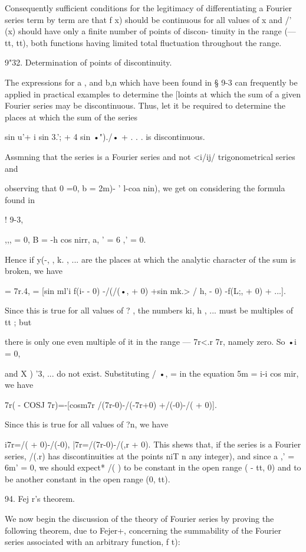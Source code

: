 Consequently sufficient conditions for the legitimacy of differentiating 
a Fourier series term by term are that f x) should be continuous for all 
values of x and /' (x) should have only a finite number of points of discon- 
tinuity in the range (— tt, tt), both functions having limited total fluctuation 
throughout the range. 

9"32. Determination of points of discontinuity. 

The expressions for a , and b,n which have been found in § 9-3 can frequently be applied 
in practical examples to determine the [loints at which the sum of a given Fourier series 
may be discontinuous. Thus, let it be required to determine the places at which the sum 
of the series 

sin u'+ i sin 3.'; + 4 sin •")./• + . . . 
is discontinuous. 

  Assmning that the series is a Fourier series and not <i/ij/ trigonometrical series and 

observing that 0 =0, b   =  2m)- '   l-coa nin), we get on considering the formula found in 

!  9-3, 

 ,,, = 0, B   =   -h cos nirr, a, ' = 6 ,' = 0. 

Hence if y(-, , k. , ... are the places at which the analytic character of the sum is broken, 
we have 

= 7r.4,  = [sin ml'i  f(i-  - 0) -/(/(•, + 0)  +sin mk.>  / h, - 0) -f(L;, + 0)  + ...]. 

Since this is true for all values of ? , the numbers ki, h , ... must be multiples of tt ; but 

there is only one even multiple of it in the range — 7r<.r 7r, namely zero. So  •i = 0, 

and X )  '3, ... do not exist. Substituting / •, = in the equation 5m = i-i cos mir, we have 

7r( - COSJ 7r)=-[cosm7r /(7r-0)-/(-7r+0) +/(-0)-/( + 0)]. 

Since this is true for all values of ?n, we have 

i7r=/( + 0)-/(-0), |7r=/(7r-0)-/(,r + 0). 
This shews that, if the series is a Fourier series, /(.r) has discontinuities at the points 
niT  n any integer), and since a ,' = 6m' = 0, we should expect* /( ) to be constant in the 
open range ( - tt, 0) and to be another constant in the open range (0, tt). 

94. Fej r's theorem. 

We now begin the discussion of the theory of Fourier series by proving 
the following theorem, due to Fejer+, concerning the summability of the 
Fourier series associated with an arbitrary function, f t): 

